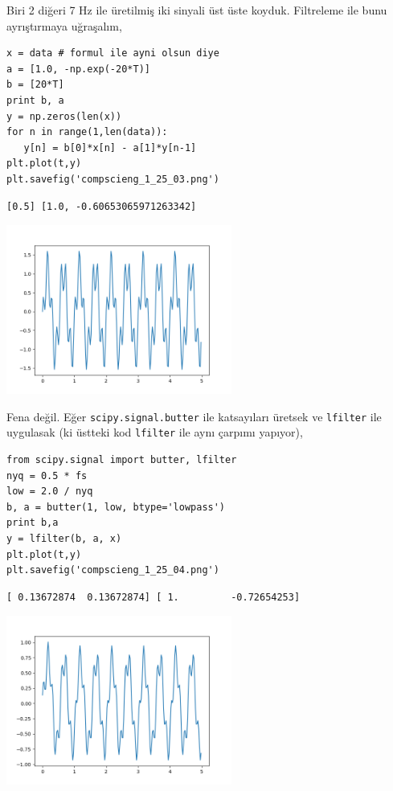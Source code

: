 \documentclass[12pt,fleqn]{article}\usepackage{../../common}
\begin{document}
Biri 2 diğeri 7 Hz ile üretilmiş iki sinyali üst üste koyduk. Filtreleme
ile bunu ayrıştırmaya uğraşalım,

\begin{verbatim}
x = data # formul ile ayni olsun diye
a = [1.0, -np.exp(-20*T)]
b = [20*T]
print b, a
y = np.zeros(len(x))
for n in range(1,len(data)):    
   y[n] = b[0]*x[n] - a[1]*y[n-1]
plt.plot(t,y)
plt.savefig('compscieng_1_25_03.png')
\end{verbatim}

\begin{verbatim}
[0.5] [1.0, -0.60653065971263342]
\end{verbatim}

\includegraphics[width=20em]{compscieng_1_25_03.png}

Fena değil. Eğer \verb!scipy.signal.butter! ile katsayıları üretsek ve
\verb!lfilter! ile uygulasak (ki üstteki kod \verb!lfilter! ile aynı
çarpımı yapıyor),

\begin{verbatim}
from scipy.signal import butter, lfilter
nyq = 0.5 * fs
low = 2.0 / nyq
b, a = butter(1, low, btype='lowpass')
print b,a
y = lfilter(b, a, x)
plt.plot(t,y)
plt.savefig('compscieng_1_25_04.png')
\end{verbatim}

\begin{verbatim}
[ 0.13672874  0.13672874] [ 1.         -0.72654253]
\end{verbatim}

\includegraphics[width=20em]{compscieng_1_25_04.png}
\end{document}
